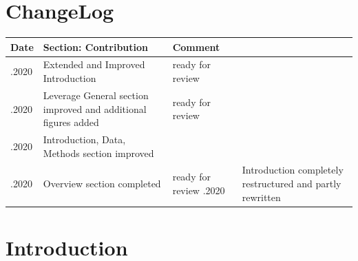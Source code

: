 \documentclass[12pt, a4paper]{article} %
\begin{document}
\section{ChangeLog}
\label{cha:history}

\begin{tabularx}{1\textwidth} { 
  | >{\raggedright\arraybackslash}X 
  | >{\raggedright\arraybackslash}X 
  | >{\raggedright\arraybackslash}X | }
 \hline
 \textbf{Date} & \textbf{Section: Contribution} & \textbf{Comment} \\
 .2020  & Extended and Improved Introduction  & ready for review  \\
 .2020  & Leverage General section improved and additional figures added  & ready for review  \\
 .2020  & Introduction, Data, Methods section improved &   \\
 .2020  & Overview section completed & ready for review
 .2020  & Introduction completely restructured and partly rewritten
  \hline
  
\end{tabularx}
\fi


\section{Introduction}
\end{document}
